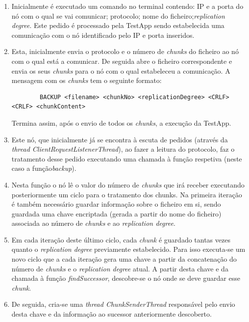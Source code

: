 \documentclass[11pt,oneside]{book}
\begin{document}
\begin{enumerate}
    
    \item Inicialmente é executado um comando no terminal contendo: IP e a porta do nó com 
    o qual se vai comunicar; protocolo; nome do ficheiro;\textit{replication degree}. 
    Este pedido é processado pela TestApp sendo estabelecida uma comunicação com o nó 
    identificado pelo IP e porta inseridos.
    
    \item Esta, inicialmente envia o protocolo e o número de \textit{chunks} do ficheiro
    ao nó com o qual está a comunicar. De seguida abre o ficheiro correspondente e envia 
    os seus  \textit{chunks} para o nó com o qual estabeleceu a comunicação. A mensagem com os 
    \textit{chunks} tem o seguinte formato:
    \begin{lstlisting}
        BACKUP <filename> <chunkNo> <replicationDegree> <CRLF><CRLF> <chunkContent>
    \end{lstlisting}
    Termina assim, após o envio de todos os \textit{chunks}, a execução da TestApp.
    
    \item Este nó, que inicialmente já se encontra à escuta de pedidos (através da 
    \textit{thread ClientRequestListenerThread}), ao fazer a leitura do protocolo, faz o
    tratamento desse pedido executando uma chamada à função respetiva (neste caso a
    função\textit{backup}).

    \item Nesta função o nó lê o valor do número de \textit{chunks} que irá receber 
    executando posteriormente um ciclo para o tratamento dos chunks. Na primeira iteração
    é também necessário guardar informação sobre o ficheiro em si, sendo guardada uma chave
    encriptada (gerada a partir do nome do ficheiro) associada ao número de \textit{chunks} e ao
    \textit{replication degree}.
            
    \item Em cada iteração deste último ciclo, cada \textit{chunk} é guardado tantas vezes quanto
    o \textit{replication degree} previamente estabelecido. Para isso executa-se um novo ciclo
    que a cada iteração gera uma chave a partir da concatenação do número de 
    \textit{chunks} e o \textit{replication degree} atual. A partir desta chave e da 
    chamada à função \textit{findSuccessor}, descobre-se o nó onde se deve guardar esse 
    \textit{chunk}.

    \item De seguida, cria-se uma \textit{thread ChunkSenderThread} responsável pelo envio desta chave e
    da informação ao sucessor anteriormente descoberto.


\end{enumerate}
\end{document}
